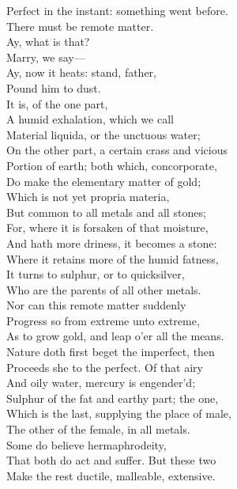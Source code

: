 \documentclass[a4paper,oneside]{memoir}
\begin{document}
\begin{drama*}
Perfect in the instant: something went before.\\
There must be remote matter.\\
\surlyspeaks {} Ay, what is that?\\
\subtlespeaks Marry, we say---\\
\mammonspeaks {} Ay, now it heats: stand, father,\\
Pound him to dust.\\
\subtlespeaks {} It is, of the one part,\\
A humid exhalation, which we call\\
Material liquida, or the unctuous water;\\
On the other part, a certain crass and vicious\\
Portion of earth; both which, concorporate,\\
Do make the elementary matter of gold;\\
Which is not yet propria materia,\\
But common to all metals and all stones;\\
For, where it is forsaken of that moisture,\\
And hath more driness, it becomes a stone:\\
Where it retains more of the humid fatness,\\
It turns to sulphur, or to quicksilver,\\
Who are the parents of all other metals.\\
Nor can this remote matter suddenly\\
Progress so from extreme unto extreme,\\
As to grow gold, and leap o'er all the means.\\
Nature doth first beget the imperfect, then\\
Proceeds she to the perfect. Of that airy\\
And oily water, mercury is engender'd;\\
Sulphur of the fat and earthy part; the one,\\
Which is the last, supplying the place of male,\\
The other of the female, in all metals.\\
Some do believe hermaphrodeity,\\
That both do act and suffer. But these two\\
Make the rest ductile, malleable, extensive.\\

\end{drama*}
\end{document}
